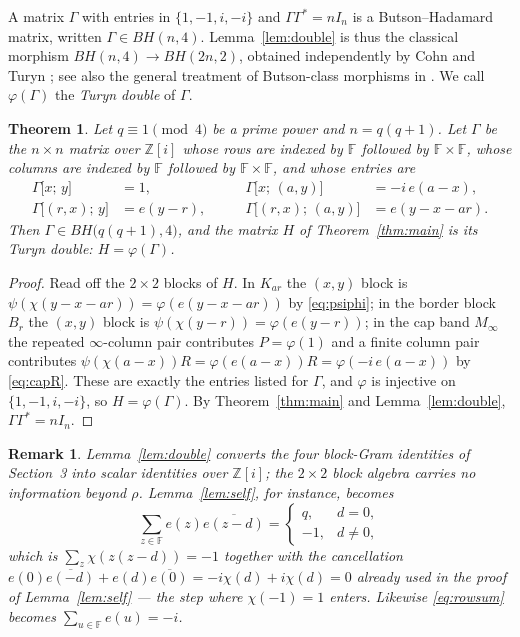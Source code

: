 \documentclass[11pt]{article}
\newtheorem{theorem}{Theorem}
\newtheorem{remark}{Remark}
\newcommand{\F}{\mathbb F}
\newcommand{\Z}{\mathbb Z}
\begin{document}
A matrix \(\Gamma\) with entries in \(\{1,-1,i,-i\}\) and
\(\Gamma\Gamma^{*}=nI_n\) is a Butson--Hadamard matrix, written
\(\Gamma\in BH(n,4)\).  Lemma~\ref{lem:double} is thus the classical
morphism \(BH(n,4)\to BH(2n,2)\), obtained independently by Cohn
\cite{Cohn1965} and Turyn \cite{Turyn1970}; see also the general treatment
of Butson-class morphisms in \cite{EganOCathain2019}.  We call
\(\varphi(\Gamma)\) the \emph{Turyn double} of \(\Gamma\).

\begin{theorem}\label{thm:complex}
Let \(q\equiv1\pmod4\) be a prime power and \(n=q(q+1)\).  Let \(\Gamma\) be
the \(n\times n\) matrix over \(\Z[i]\) whose rows are indexed by \(\F\)
followed by \(\F\times\F\), whose columns are indexed by \(\F\) followed by
\(\F\times\F\), and whose entries are
\[
\begin{aligned}
        \Gamma\bigl[x;\,y\bigr]&=1, &\qquad
        \Gamma\bigl[x;\,(a,y)\bigr]&=-i\,e(a-x),\\[2pt]
        \Gamma\bigl[(r,x);\,y\bigr]&=e(y-r), &\qquad
        \Gamma\bigl[(r,x);\,(a,y)\bigr]&=e(y-x-ar).
\end{aligned}
\]
Then \(\Gamma\in BH\bigl(q(q+1),4\bigr)\), and the matrix \(H\) of
Theorem~\ref{thm:main} is its Turyn double: \(H=\varphi(\Gamma)\).
\end{theorem}

\begin{proof}
Read off the \(2\times2\) blocks of \(H\).  In \(K_{ar}\) the \((x,y)\) block
is \(\psi(\chi(y-x-ar))=\varphi(e(y-x-ar))\) by \eqref{eq:psiphi}; in the
border block \(B_r\) the \((x,y)\) block is
\(\psi(\chi(y-r))=\varphi(e(y-r))\); in the cap band \(M_\infty\) the
repeated \(\infty\)-column pair contributes \(P=\varphi(1)\) and a finite
column pair contributes
\(\psi(\chi(a-x))R=\varphi(e(a-x))R=\varphi(-i\,e(a-x))\) by
\eqref{eq:capR}.  These are exactly the entries listed for \(\Gamma\), and
\(\varphi\) is injective on \(\{1,-1,i,-i\}\), so \(H=\varphi(\Gamma)\).
By Theorem~\ref{thm:main} and Lemma~\ref{lem:double},
\(\Gamma\Gamma^{*}=nI_n\).
\end{proof}

\begin{remark}\label{rem:scalar}
Lemma~\ref{lem:double} converts the four block-Gram identities of Section~3 into
scalar identities over \(\Z[i]\); the \(2\times2\) block algebra carries no
information beyond \(\rho\).  Lemma~\ref{lem:self}, for instance, becomes
\[
        \sum_{z\in\F}e(z)\overline{e(z-d)}=
        \begin{cases} q,& d=0,\\ -1,& d\neq0,\end{cases}
\]
which is \(\sum_{z}\chi(z(z-d))=-1\) together with the cancellation
\(e(0)\overline{e(-d)}+e(d)\overline{e(0)}=-i\chi(d)+i\chi(d)=0\) already
used in the proof of Lemma~\ref{lem:self} --- the step where
\(\chi(-1)=1\) enters.  Likewise \eqref{eq:rowsum} becomes
\(\sum_{u\in\F}e(u)=-i\).
\end{remark}
\end{document}
